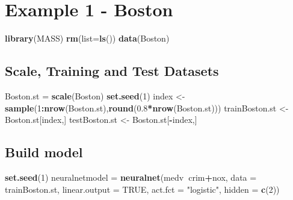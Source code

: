 \documentclass[
]{book}
\newenvironment{Shaded}{\begin{snugshade}}{\end{snugshade}}
\newcommand{\DataTypeTok}[1]{\textcolor[rgb]{0.13,0.29,0.53}{#1}}
\newcommand{\DecValTok}[1]{\textcolor[rgb]{0.00,0.00,0.81}{#1}}
\newcommand{\FloatTok}[1]{\textcolor[rgb]{0.00,0.00,0.81}{#1}}
\newcommand{\KeywordTok}[1]{\textcolor[rgb]{0.13,0.29,0.53}{\textbf{#1}}}
\newcommand{\NormalTok}[1]{#1}
\newcommand{\OperatorTok}[1]{\textcolor[rgb]{0.81,0.36,0.00}{\textbf{#1}}}
\newcommand{\OtherTok}[1]{\textcolor[rgb]{0.56,0.35,0.01}{#1}}
\newcommand{\StringTok}[1]{\textcolor[rgb]{0.31,0.60,0.02}{#1}}
\begin{document}
\hypertarget{example-1---boston}{%
\section{Example 1 - Boston}\label{example-1---boston}}

\begin{Shaded}
\begin{Highlighting}[]
\KeywordTok{library}\NormalTok{(MASS)}
\KeywordTok{rm}\NormalTok{(}\DataTypeTok{list=}\KeywordTok{ls}\NormalTok{())}
\KeywordTok{data}\NormalTok{(Boston)}
\end{Highlighting}
\end{Shaded}

\hypertarget{scale-training-and-test-datasets}{%
\subsection{Scale, Training and Test Datasets}\label{scale-training-and-test-datasets}}

\begin{Shaded}
\begin{Highlighting}[]
\NormalTok{Boston.st =}\StringTok{ }\KeywordTok{scale}\NormalTok{(Boston)}
\KeywordTok{set.seed}\NormalTok{(}\DecValTok{1}\NormalTok{)}
\NormalTok{index <-}\StringTok{ }\KeywordTok{sample}\NormalTok{(}\DecValTok{1}\OperatorTok{:}\KeywordTok{nrow}\NormalTok{(Boston.st),}\KeywordTok{round}\NormalTok{(}\FloatTok{0.8}\OperatorTok{*}\KeywordTok{nrow}\NormalTok{(Boston.st)))}
\NormalTok{trainBoston.st <-}\StringTok{ }\NormalTok{Boston.st[index,]}
\NormalTok{testBoston.st <-}\StringTok{ }\NormalTok{Boston.st[}\OperatorTok{-}\NormalTok{index,]}
\end{Highlighting}
\end{Shaded}

\hypertarget{build-model}{%
\subsection{Build model}\label{build-model}}

\begin{Shaded}
\begin{Highlighting}[]
\KeywordTok{set.seed}\NormalTok{(}\DecValTok{1}\NormalTok{)}
\NormalTok{neuralnetmodel =}\StringTok{ }\KeywordTok{neuralnet}\NormalTok{(medv}\OperatorTok{~}\NormalTok{crim}\OperatorTok{+}\NormalTok{nox, }\DataTypeTok{data =}\NormalTok{ trainBoston.st, }
                           \DataTypeTok{linear.output =} \OtherTok{TRUE}\NormalTok{, }
                           \DataTypeTok{act.fct =} \StringTok{"logistic"}\NormalTok{,}
                           \DataTypeTok{hidden =} \KeywordTok{c}\NormalTok{(}\DecValTok{2}\NormalTok{))}
\end{Highlighting}
\end{Shaded}
\end{document}
